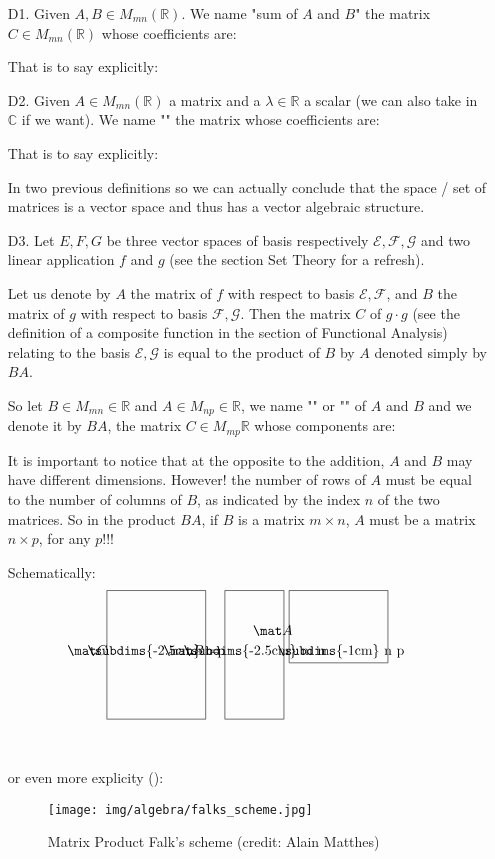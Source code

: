 	\begin{enumerate}
		\item[D1.] Given $A,B\in M_{mn} (\mathbb{R})$. We name "sum of $A$ and $B$" the matrix $C\in M_{mn}(\mathbb{R})$ whose coefficients are:
		
		That is to say explicitly:
		
		
		\item[D2.] Given $A\in M_{mn} (\mathbb{R})$ a matrix and a $\lambda\in \mathbb{R}$ a scalar (we can also take in $\mathbb{C}$ if we want). We name "" the matrix whose coefficients are:
		
		That is to say explicitly:
		
		In two previous definitions so we can actually conclude that the space / set of matrices is a vector space and thus has a vector algebraic structure.
		
		\item[D3.] Let $E, F, G$ be three  vector spaces of basis respectively $\mathcal{E},\mathcal{F},\mathcal{G}$ and two linear application $f$ and $g$ (see the section Set Theory for a refresh).
		
		Let us denote by $A$ the matrix of $f$ with respect to basis $\mathcal{E},\mathcal{F}$, and $B$ the matrix of $g$ with respect to basis $\mathcal{F},\mathcal{G}$. Then the matrix $C$ of $g\cdot g$ (see the definition of a composite function in the section of Functional Analysis) relating to the basis $\mathcal{E},\mathcal{G}$ is equal to the product of $B$ by $A$ denoted simply by $BA$.
		
		So let $B\in M_{mn} \in \mathbb{R}$ and $A\in M_{np} \in \mathbb{R}$, we name "" or "" of $A$ and $B$ and we denote it by $BA$, the matrix $C\in M_{mp}\mathbb{R}$ whose components are:
		
		It is important to notice that at the opposite to the addition, $A$ and $B$ may have different dimensions. However! the number of rows of $A$ must be equal to the number of columns of $B$, as indicated by the index $n$ of the two matrices. So in the product $BA$, if $B$ is a matrix $m\times n$, $A$ must be a matrix $n\times p$, for any $p$!!!
		
		Schematically:
		{\Huge{
		\[
		\framebox[2.5cm]{\clap{\raisebox{0pt}[1.5cm][1.5cm]{$\mat C$}}\subdims{-2.5cm} n p} =
		\framebox[1.5cm]{\clap{\raisebox{0pt}[1.5cm][1.5cm]{$\mat B$}}\subdims{-2.5cm} m n} \ 
		\framebox[2.5cm]{\clap{\raisebox{5mm}[1.5cm]{$\mat A$}}     \subdims{-1cm} n p} 
		\]}}\\\\
		
		or even more explicity ():
		\begin{figure}[H]
		\centering
			\texttt{[image: img/algebra/falks\_scheme.jpg]}
			\caption[Matrix Product Falk's scheme]{Matrix Product Falk's scheme (credit: Alain Matthes)}
		\end{figure}
	\end{enumerate}
